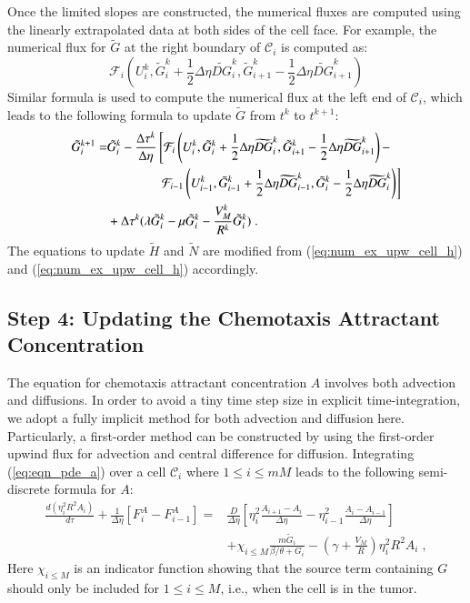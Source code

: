 \documentclass{amsart}
\theoremstyle{definition}
\theoremstyle{remark}
\numberwithin{equation}{section}
\numberwithin{figure}{section}
\begin{document}
Once the limited slopes are constructed, the numerical fluxes are computed using the linearly extrapolated data at both sides of the cell face.
For example, the numerical flux for $\tilde{G}$ at the right boundary of $\mathcal{C}_i$ is computed as:
\begin{displaymath}
\mathcal{F}_i\left(U_i^k,\tilde{G}_i^k+\frac{1}{2}\Delta\eta\widetilde{DG}^k_i,\tilde{G}_{i+1}^k-\frac{1}{2}\Delta\eta\widetilde{DG}^k_{i+1}\right)
\end{displaymath}
Similar formula is used to compute the numerical flux at the left end of $\mathcal{C}_i$, which leads to the following formula to update $\tilde{G}$ from $t^k$ to $t^{k+1}$:
\begin{align*}
\tilde{G}_i^{k+1} =& \tilde{G}_i^k - \frac{\Delta\tau^k}{\Delta\eta}\left[\mathcal{F}_i\left(U_i^k,\tilde{G}_i^k+\frac{1}{2}\Delta\eta\widetilde{DG}^k_i,\tilde{G}_{i+1}^k-\frac{1}{2}\Delta\eta\widetilde{DG}^k_{i+1}\right)-\right. \\
    &\qquad\qquad\left.\mathcal{F}_{i-1}\left(U_{i-1}^k,\tilde{G}_{i-1}^k+\frac{1}{2}\Delta\eta\widetilde{DG}^k_{i-1},\tilde{G}_i^k-\frac{1}{2}\Delta\eta\widetilde{DG}^k_i\right)\right] \\
\notag
    & + \Delta\tau^k(\lambda\tilde{G}_i^k-\mu\tilde{G}_i^k-\frac{V_M^k}{R^k}\tilde{G}_i^k)\;.
\end{align*}
The equations to update $\tilde{H}$ and $\tilde{N}$ are modified from (\ref{eq:num_ex_upw_cell_h}) and (\ref{eq:num_ex_upw_cell_h}) accordingly.

\subsection{Step 4: Updating the Chemotaxis Attractant Concentration}
The equation for chemotaxis attractant concentration $A$ involves both advection and diffusions.
In order to avoid a tiny time step size in explicit time-integration, we adopt a fully implicit method for both advection and diffusion here.
Particularly, a first-order method can be constructed by using the first-order upwind flux for advection and central difference for diffusion.
Integrating (\ref{eq:eqn_pde_a}) over a cell $\mathcal{C}_i$ where $1\le i\le mM$ leads to the following semi-discrete formula for $A$:
\begin{align*}
\frac{d(\eta_i^2R^2A_i)}{d\tau} + \frac{1}{\Delta\eta}\left[F_i^A-F_{i-1}^A\right] =& \frac{D}{\Delta\eta}\left[\eta_i^2\frac{A_{i+1}-A_i}{\Delta\eta}-\eta_{i-1}^2\frac{A_i-A_{i-1}}{\Delta\eta}\right] \\
&+ \chi_{i\le M}\frac{m\tilde{G}_i}{\beta/\theta+G_i}-\left(\gamma+\frac{V_M}{R}\right)\eta_i^2R^2A_i\;,
\end{align*}
Here $\chi_{i\le M}$ is an indicator function showing that the source term containing $G$ should only be included for $1\le i\le M$, i.e., when the cell is in the tumor.
\end{document}
